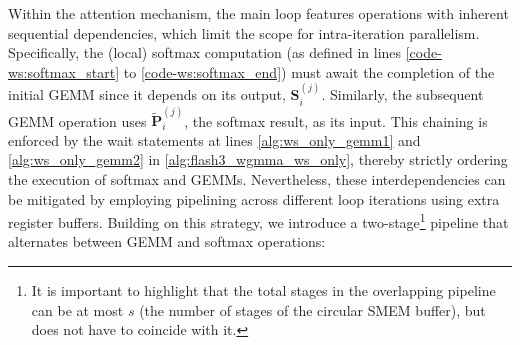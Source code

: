 Within the attention mechanism, the main loop features operations with inherent sequential dependencies, which limit the scope for intra-iteration parallelism. Specifically, the (local) softmax computation (as defined in lines \ref{code-ws:softmax_start} to \ref{code-ws:softmax_end}) must await the completion of the initial GEMM since it depends on its output, $\mathbf{S}_i^{(j)}$. Similarly, the subsequent GEMM operation uses $\widetilde{\mathbf{P}}_i^{(j)}$, the softmax result, as its input. This chaining is enforced by the wait statements at lines \ref{alg:ws_only_gemm1} and \ref{alg:ws_only_gemm2} in \cref{alg:flash3_wgmma_ws_only}, thereby strictly ordering the execution of softmax and GEMMs. Nevertheless, these interdependencies can be mitigated by employing pipelining across different loop iterations using extra register buffers. Building on this strategy, we introduce a two-stage\footnote{It is important to highlight that the total stages in the overlapping pipeline can be at most $s$ (the number of stages of the circular SMEM buffer), but does not have to coincide with it.} pipeline that alternates between GEMM and softmax operations:

